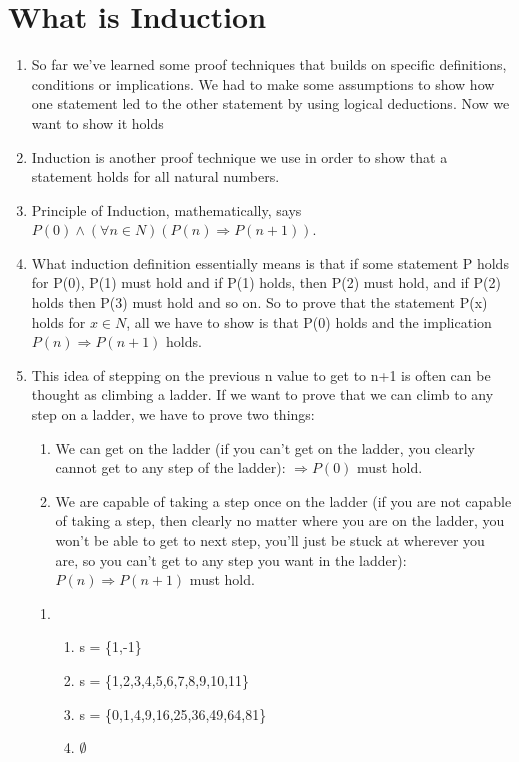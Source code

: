 \documentclass[11pt]{article}
\begin{document}
\section*{What is Induction}
\begin{enumerate}
\item So far we've learned some proof techniques that builds on specific definitions, conditions or implications. We had to make some assumptions to show how one statement led to the other statement by using logical deductions. Now we want to show it holds
\item Induction is another proof technique we use in order to show that a statement holds for all natural numbers.
\item Principle of Induction, mathematically, says $ P(0) \wedge (\forall n \in N) (P(n) \Rightarrow P(n+1)) $. 
\item What induction definition essentially means is that if some statement P holds for P(0), P(1) must hold and if P(1) holds, then P(2) must hold, and if P(2) holds then P(3) must hold and so on. So to prove that the statement P(x) holds for $x \in N$, all we have to show is that P(0) holds and the implication $P(n) \Rightarrow P(n+1) $ holds.
\item This idea of stepping on the previous n value to get to n+1 is often can be thought as climbing a ladder. If we want to prove that we can climb to any step on a ladder, we have to prove two things:


\begin{enumerate}
\item We can get on the ladder (if you can't get on the ladder, you clearly cannot get to any step of the ladder): $\Rightarrow P(0)$ must hold.
\item We are capable of taking a step once on the ladder (if you are not capable of taking a step, then clearly no matter where you are on the ladder, you won't be able to get to next step, you'll just be stuck at wherever you are, so you can't get to any step you want in the ladder): $P(n) \Rightarrow P(n+1)$ must hold.
\end{enumerate}
\begin{enumerate}
\item
\begin{enumerate}
\item s = \{1,-1\}
\item s = \{1,2,3,4,5,6,7,8,9,10,11\}
\item s = \{0,1,4,9,16,25,36,49,64,81\}
\item $\emptyset$
\end{enumerate}


\end{enumerate}
\end{enumerate}
\end{document}
